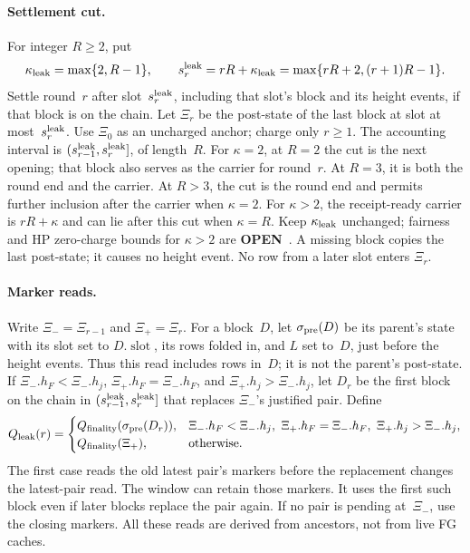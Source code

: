 \documentclass{article}
\theoremstyle{plain}
\theoremstyle{definition}
\theoremstyle{remark}
\newcommand{\slot}{\operatorname{slot}}
\newcommand{\Qfin}{Q_{\mathrm{finality}}}
\newcommand{\OPEN}{\textbf{OPEN}}
\begin{document}
\paragraph{Settlement cut.}
For integer $R\geq2$, put
\[
 \kappa_{\rm leak}=\max\{2,R-1\},\qquad
 s^{\rm leak}_r=rR+\kappa_{\rm leak}=\max\{rR+2,(r+1)R-1\}.
\]
Settle round~$r$ after slot~$s^{\rm leak}_r$, including that slot's block and
its height events, if that block is on the chain.  Let $\Xi_r$ be the
post-state of the last block at slot at most~$s^{\rm leak}_r$.
Use $\Xi_0$ as an uncharged anchor; charge only $r\geq1$.
The accounting interval is $(s^{\rm leak}_{r-1},s^{\rm leak}_r]$, of length~$R$.
For $\kappa=2$, at $R=2$ the cut is the next opening; that block also serves as
the carrier for round~$r$.  At $R=3$, it is both the round end and the carrier.
At $R>3$, the cut is the round end and permits further inclusion
after the carrier when $\kappa=2$.  For $\kappa>2$, the receipt-ready
carrier is $rR+\kappa$ and can lie after this cut when $\kappa=R$.
Keep $\kappa_{\rm leak}$ unchanged; fairness and HP zero-charge bounds
for $\kappa>2$ are \OPEN~\cite[F5]{FPR}.
A missing block copies the last post-state;
it causes no height event.  No row from a later slot enters $\Xi_r$.

\paragraph{Marker reads.}
Write $\Xi_-=\Xi_{r-1}$ and $\Xi_+=\Xi_r$.  For a block~$D$, let
$\sigma_{\rm pre}(D)$ be its parent's state with its slot set to
$D.\slot$, its rows folded in, and $L$ set to~$D$, just before
the height events.  Thus this read includes rows in~$D$; it is not
the parent's post-state.
If $\Xi_-.h_F<\Xi_-.h_j$, $\Xi_+.h_F=\Xi_-.h_F$, and $\Xi_+.h_j>\Xi_-.h_j$, let $D_r$
be the first block on the chain in $(s^{\rm leak}_{r-1},s^{\rm leak}_r]$ that replaces $\Xi_-$'s justified
pair.  Define
\[
 Q_{\rm leak}(r)=\begin{cases}
 \Qfin(\sigma_{\rm pre}(D_r)),
   & \Xi_-.h_F<\Xi_-.h_j,\ \Xi_+.h_F=\Xi_-.h_F,\ \Xi_+.h_j>\Xi_-.h_j,\\
 \Qfin(\Xi_+),&\text{otherwise}.
 \end{cases}
\]
The first case reads the old latest pair's markers before the replacement
changes the latest-pair read.  The window can retain those markers.  It uses the first such block even if later blocks replace
the pair again.  If no pair is pending at~$\Xi_-$, use the closing markers.
All these reads are derived from ancestors, not from live FG caches.
\end{document}
